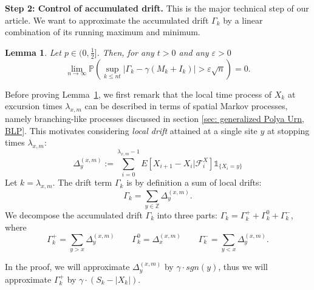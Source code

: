 \documentclass[twoside,12pt,a4paper]{article}
\newtheorem{lemma}{Lemma}[section]
\numberwithin{equation}{section}
\newcommand{\abs}[1]{\left\vert #1 \right\vert}
\newcommand\TBD{\textcolor{red}{TBD.}}
\newcommand{\comment}[1]{\textcolor{blue}{#1}}
\begin{document}
	\textbf{Step 2: Control of accumulated drift.} This is the major technical step of our article. We want to approximate the accumulated drift $\Gamma_k$ by a linear combination of its running maximum and minimum.
	\begin{lemma}\label{lm: control of acc drift}
		Let $p\in (0,\frac{1}{2}]$. Then, for any $t>0$ and any $\varepsilon >0$
		\begin{equation}\label{eq: control of acc drift}
			\lim_{n \to \infty }\mathbb{P}\left(\sup_{k\leq nt} \abs{\Gamma_k - \gamma \left(M_k + I_k \right)   } > \varepsilon \sqrt{n}  \right) =0. 
		\end{equation}
	\end{lemma}
	Before proving Lemma~\ref{lm: control of acc drift}, we first remark that the local time process of $X_k$ at excursion times $\lambda_{x,m}$ can be described in terms of spatial Markov processes, namely branching-like processes discussed in section \ref{sec: generalized Polya Urn, BLP}. This motivates considering \textit{local drift} attained at a single site $y$ at stopping times $\lambda_{x, m}$:
	\begin{equation}\label{eq: accumulated local drift}
		\Delta_y^{(x,m)}:= \sum_{i=0}^{\lambda_{x,m}-1} E\left[X_{i+1}-X_i\vert \mathcal{F}_{i}^X\right] \mathbb{1}_{\{X_i=y\}}
	\end{equation}
	Let $k = \lambda_{x,m}$. The drift term $\Gamma_k$ is by definition a sum of local drifts:
	\begin{equation}
		\Gamma_k = \sum_{y\in \mathbb{Z}} \Delta_y^{(x,m)}
		.\end{equation}
	We decompose the accumulated drift $\Gamma_k$ into three parts: $\Gamma_k = 	\Gamma_k^+ +	\Gamma_k^0 + \Gamma_k^-$, where 
	\[
	\Gamma_k^{+} = \sum_{y > x} \Delta_y^{(x,m)}\qquad 
	\Gamma_k^{0} = \Delta_x^{(x,m)} \qquad
	\Gamma_k^{-} = \sum_{y < x} \Delta_y^{(x,m)}
	.\]
	\iffalse
	\begin{align*}
		\Gamma_k^{+ \phantom{0}} &= \sum_{y > x} \Delta_y^{(x,m)}\\
		\Gamma_k^{0 \phantom{+}} &= \Delta_x^{(x,m)} \\[0.6em]
		\Gamma_k^{- \phantom{0}} &= \sum_{y < x} \Delta_{y}^{(x,m)}
		.\end{align*} 
	\fi
	In the proof, we will approximate $\Delta_y^{(x,m)}$ by $\gamma\cdot sgn(y)$, thus we will approximate $\Gamma_k^+$ by $\gamma \cdot (S_k - \abs{X_k})$. 
	
\end{document}
